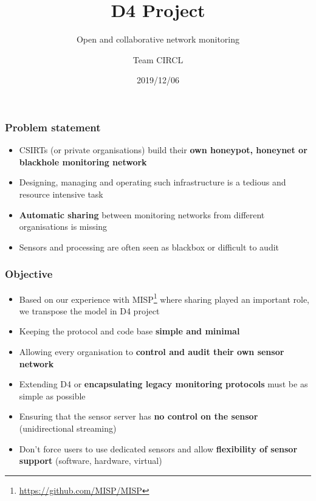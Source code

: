 \documentclass{beamer}
\title{D4 Project}
\subtitle{Open and collaborative network monitoring}
\author{Team CIRCL}
\institute{\url{https://www.d4-project.org/}}
\date{2019/12/06}
\begin{document}
    \begin{frame}
        \maketitle
    \end{frame}

\begin{frame}
        \frametitle{Problem statement}
        \begin{itemize}
                \item CSIRTs (or private organisations) build their {\bf own honeypot, honeynet or blackhole monitoring network}
                \item Designing, managing and operating such infrastructure is a tedious and resource intensive task
                \item {\bf Automatic sharing} between monitoring networks from different organisations is missing
                \item Sensors and processing are often seen as blackbox or difficult to audit

        \end{itemize}
\end{frame}


\begin{frame}
 \frametitle{Objective}
 \begin{itemize}
         \item Based on our experience with MISP\footnote{\url{https://github.com/MISP/MISP}} where sharing played an important role, we transpose
                 the model in D4 project
         \item Keeping the protocol and code base {\bf simple and minimal}
         \item Allowing every organisation to {\bf control and audit their own sensor network}
         \item Extending D4 or {\bf encapsulating legacy monitoring protocols} must be as simple as possible
         \item Ensuring that the sensor server has {\bf no control on the sensor} (unidirectional streaming)
         \item Don't force users to use dedicated sensors and allow {\bf flexibility of sensor support} (software, hardware, virtual)

 \end{itemize}
\end{frame}
\end{document}
